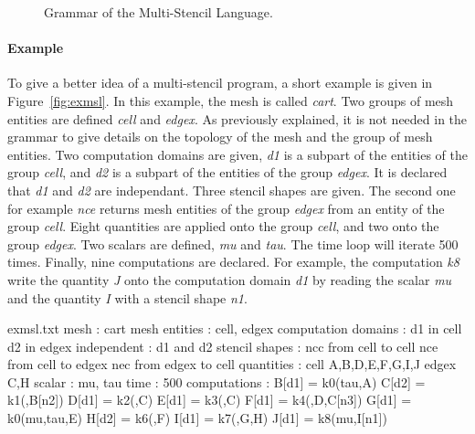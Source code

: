 \begin{figure}[!h]
  \hspace{5mm}
  \begin{minipage}[!h]{0.98\textwidth}
    {}   
    \caption{Grammar of the Multi-Stencil Language. \label{fig:grammar}}
  \end{minipage}
\end{figure}

\paragraph{\textbf{Example}} To give a better idea of a multi-stencil program, a short example is given in Figure~\ref{fig:exmsl}. In this example, the mesh is called \textit{cart}. Two groups of mesh entities are defined \textit{cell} and \textit{edgex}. As previously explained, it is not needed in the grammar to give details on the topology of the mesh and the group of mesh entities. Two computation domains are given, \textit{d1} is a subpart of the entities of the group \textit{cell}, and \textit{d2} is a subpart of the entities of the group \textit{edgex}. It is declared that \textit{d1} and \textit{d2} are independant. Three stencil shapes are given. The second one for example \textit{nce} returns mesh entities of the group \textit{edgex} from an entity of the group \textit{cell}. Eight quantities are applied onto the group \textit{cell}, and two onto the group \textit{edgex}. Two scalars are defined, \textit{mu} and \textit{tau}. The time loop will iterate 500 times. Finally, nine computations are declared. For example, the computation \textit{k8} write the quantity \textit{J} onto the computation domain \textit{d1} by reading the scalar \textit{mu} and the quantity \textit{I} with a stencil shape \textit{n1}.

\begin{filecontents*}{exmsl.txt}
mesh : cart
mesh entities : cell, edgex
computation domains :
  d1 in cell
  d2 in edgex
independent :
  d1 and d2
stencil shapes : 
  ncc from cell to cell
  nce from cell to edgex
  nec from edgex to cell
quantities :
  cell A,B,D,E,F,G,I,J
  edgex C,H
scalar : mu, tau
time : 500
computations :
  B[d1] = k0({tau},{A})
  C[d2] = k1({},{B[n2]})
  D[d1] = k2({},{C})
  E[d1] = k3({},{C})
  F[d1] = k4({},{D,C[n3]})
  G[d1] = k0({mu,tau},{E})
  H[d2] = k6({},{F})
  I[d1] = k7({},{G,H})
  J[d1] = k8({mu},{I[n1]})
\end{filecontents*}

